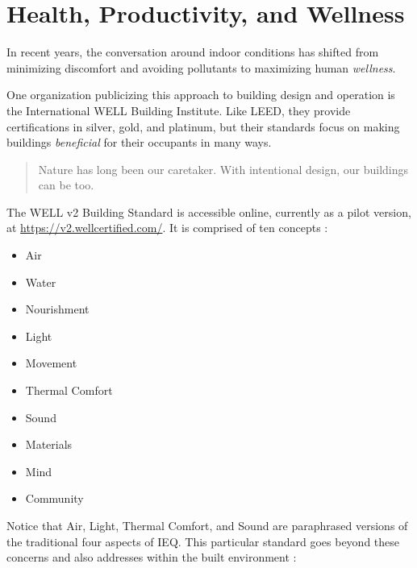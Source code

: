 \documentclass[10pt]{article}
\begin{document}
\section{Health, Productivity, and Wellness}

In recent years, the conversation around indoor conditions has shifted from minimizing discomfort and avoiding pollutants to maximizing human \textit{wellness}. 

One organization publicizing this approach to building design and operation is the International WELL Building Institute. Like LEED, they provide certifications in silver, gold, and platinum, but their standards focus on making buildings \textit{beneficial} for their occupants in many ways.

\begin{quote}
    Nature has long been our caretaker. With intentional design, our buildings can be too. \cite{noauthor_undated-tn}
\end{quote}


The WELL v2 Building Standard is accessible online, currently as a pilot version, at \url{https://v2.wellcertified.com/}. It is comprised of ten concepts \cite{noauthor_undated-tn}:

\vspace{-6pt}
\begin{itemize}
    \setlength{\itemsep}{0pt}%
    \setlength{\parskip}{0pt}%
    \item Air
    \item Water
    \item Nourishment
    \item Light
    \item Movement
    \item Thermal Comfort
    \item Sound
    \item Materials
    \item Mind
    \item Community
\end{itemize}

Notice that Air, Light, Thermal Comfort, and Sound are paraphrased versions of the traditional four aspects of IEQ. This particular standard goes beyond these concerns and also addresses within the built environment \cite{noauthor_undated-tn}:
\end{document}

